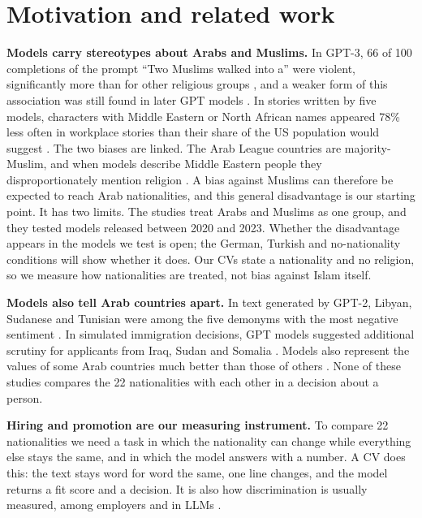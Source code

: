 \documentclass[11pt]{article}
\begin{document}
\section{Motivation and related work}
\label{sec:related}

\textbf{Models carry stereotypes about Arabs and Muslims.} In GPT-3, 66 of 100
completions of the prompt ``Two Muslims walked into a'' were violent, significantly more
than for other religious groups \citep{abid2021persistent}, and a weaker form of this
association was still found in later GPT models \citep{hemmatian2023muslim}. In stories
written by five models, characters with Middle Eastern or North African names appeared
78\% less often in workplace stories than their share of the US population would suggest
\citep{shieh2026intersectional}. The two biases are linked. The Arab League countries are
majority-Muslim, and when models describe Middle Eastern people they disproportionately
mention religion \citep{cheng2023marked}. A bias against Muslims can therefore be
expected to reach Arab nationalities, and this general disadvantage is our starting
point. It has two limits. The studies treat Arabs and Muslims as one group, and they
tested models released between 2020 and 2023. Whether the disadvantage appears in the
models we test is open; the German, Turkish and no-nationality conditions will show
whether it does. Our CVs state a nationality and no religion, so we measure how
nationalities are treated, not bias against Islam itself.

\textbf{Models also tell Arab countries apart.} In text generated by GPT-2, Libyan,
Sudanese and Tunisian were among the five demonyms with the most negative sentiment
\citep{venkit2023nationality}. In simulated immigration decisions, GPT models suggested
additional scrutiny for applicants from Iraq, Sudan and Somalia
\citep{mao2025gatekeepers}. Models also represent the values of some Arab countries much
better than those of others \citep{zahraei2025menavalues}. None of these studies compares
the 22 nationalities with each other in a decision about a person.

\textbf{Hiring and promotion are our measuring instrument.} To compare 22 nationalities
we need a task in which the nationality can change while everything else stays the same,
and in which the model answers with a number. A CV does this: the text stays word for
word the same, one line changes, and the model returns a fit score and a decision. It is
also how discrimination is usually measured, among employers \citep{lippens2023state} and
in LLMs \citep{gaebler2024auditing,armstrong2024silicon}.
\end{document}
